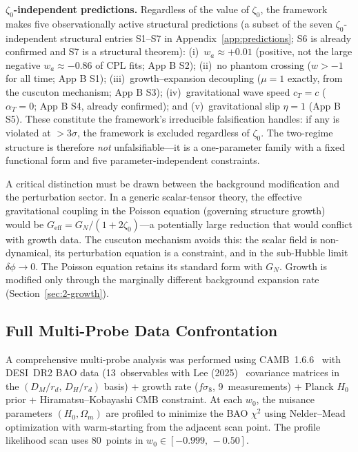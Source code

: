 \textbf{$\zeta_0$-independent predictions.} Regardless of the value of $\zeta_0$, the framework makes five observationally active structural predictions (a subset of the seven $\zeta_0$-independent structural entries S1--S7 in Appendix~\ref{app:predictions}; S6 is already confirmed and S7 is a structural theorem): (i)~$w_a \approx +0.01$ (positive, not the large negative $w_a \approx -0.86$ of CPL fits; App B S2); (ii)~no phantom crossing ($w > -1$ for all time; App B S1); (iii)~growth--expansion decoupling ($\mu = 1$ exactly, from the cuscuton mechanism; App B S3); (iv)~gravitational wave speed $c_T = c$ ($\alpha_T = 0$; App B S4, already confirmed); and (v)~gravitational slip $\eta = 1$ (App B S5). These constitute the framework's irreducible falsification handles: if any is violated at $>3\sigma$, the framework is excluded regardless of $\zeta_0$. The two-regime structure is therefore \emph{not} unfalsifiable---it is a one-parameter family with a fixed functional form and five parameter-independent constraints.

A critical distinction must be drawn between the background modification and the perturbation sector. In a generic scalar-tensor theory, the effective gravitational coupling in the Poisson equation (governing structure growth) would be $G_\mathrm{eff} = G_N/(1 + 2\zeta_0)$---a potentially large reduction that would conflict with growth data. The cuscuton mechanism avoids this: the scalar field is non-dynamical, its perturbation equation is a constraint, and in the sub-Hubble limit $\delta\phi \to 0$. The Poisson equation retains its standard form with $G_N$. Growth is modified only through the marginally different background expansion rate (Section~\ref{sec:2-growth}).

\subsection{Full Multi-Probe Data Confrontation}
\label{sec:2-multiprobe-full}

A comprehensive multi-probe analysis was performed using CAMB~1.6.6~\cite{ch2:Lewis2000} with DESI~DR2 BAO data (13~observables with Lee (2025)~\cite{ch2:Lee2025} covariance matrices in the $(D_M/r_d,\, D_H/r_d)$ basis) + growth rate ($f\sigma_8$, 9~measurements) + Planck $H_0$ prior + Hiramatsu--Kobayashi CMB constraint.  At each $w_0$, the nuisance parameters $(H_0, \Omega_m)$ are profiled to minimize the BAO $\chi^2$ using Nelder--Mead optimization with warm-starting from the adjacent scan point. The profile likelihood scan uses 80~points in $w_0 \in [-0.999,\, -0.50]$.

